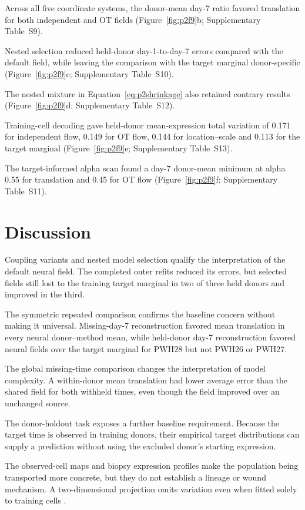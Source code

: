 \documentclass[10pt,a4paper]{article}
\begin{document}
Across all five coordinate systems, the donor-mean day-7 ratio favored translation for both independent and OT fields (Figure~\ref{fig:p2f9}b; Supplementary Table~S9).



Nested selection reduced held-donor day-1-to-day-7 errors compared with the default field, while leaving the comparison with the target marginal donor-specific (Figure~\ref{fig:p2f9}c; Supplementary Table~S10).

The nested mixture in Equation~\eqref{eq:p2shrinkage} also retained contrary results (Figure~\ref{fig:p2f9}d; Supplementary Table~S12).

Training-cell decoding gave held-donor mean-expression total variation of 0.171 for independent flow, 0.149 for OT flow, 0.144 for location--scale and 0.113 for the target marginal (Figure~\ref{fig:p2f9}e; Supplementary Table~S13).

The target-informed alpha scan found a day-7 donor-mean minimum at alpha 0.55 for translation and 0.45 for OT flow (Figure~\ref{fig:p2f9}f; Supplementary Table~S11).

\section{Discussion}

Coupling variants and nested model selection qualify the interpretation of the default neural field. The completed outer refits reduced its errors, but selected fields still lost to the training target marginal in two of three held donors and improved in the third.

The symmetric repeated comparison confirms the baseline concern without making it universal. Missing-day-7 reconstruction favored mean translation in every neural donor--method mean, while held-donor day-7 reconstruction favored neural fields over the target marginal for PWH28 but not PWH26 or PWH27.

The global missing-time comparison changes the interpretation of model complexity. A within-donor mean translation had lower average error than the shared field for both withheld times, even though the field improved over an unchanged source.

The donor-holdout task exposes a further baseline requirement. Because the target time is observed in training donors, their empirical target distributions can supply a prediction without using the excluded donor's starting expression.

The observed-cell maps and biopsy expression profiles make the population being transported more concrete, but they do not establish a lineage or wound mechanism. A two-dimensional projection omits variation even when fitted solely to training cells \citep{huang2022visualization}.
\end{document}
